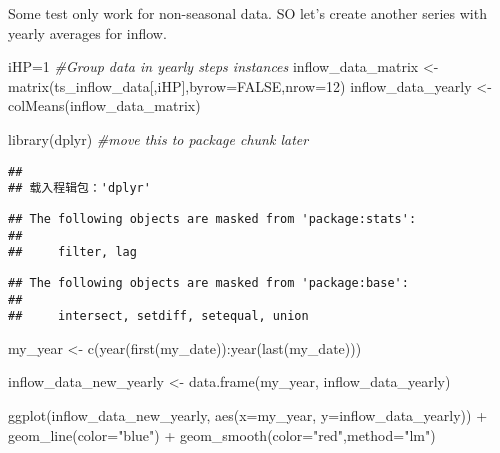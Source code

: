 \documentclass[
]{article}
\newenvironment{Shaded}{\begin{snugshade}}{\end{snugshade}}
\newcommand{\AttributeTok}[1]{\textcolor[rgb]{0.77,0.63,0.00}{#1}}
\newcommand{\CommentTok}[1]{\textcolor[rgb]{0.56,0.35,0.01}{\textit{#1}}}
\newcommand{\ConstantTok}[1]{\textcolor[rgb]{0.00,0.00,0.00}{#1}}
\newcommand{\DecValTok}[1]{\textcolor[rgb]{0.00,0.00,0.81}{#1}}
\newcommand{\FunctionTok}[1]{\textcolor[rgb]{0.00,0.00,0.00}{#1}}
\newcommand{\NormalTok}[1]{#1}
\newcommand{\OtherTok}[1]{\textcolor[rgb]{0.56,0.35,0.01}{#1}}
\newcommand{\SpecialCharTok}[1]{\textcolor[rgb]{0.00,0.00,0.00}{#1}}
\newcommand{\StringTok}[1]{\textcolor[rgb]{0.31,0.60,0.02}{#1}}
\begin{document}
Some test only work for non-seasonal data. SO let's create another
series with yearly averages for inflow.

\begin{Shaded}
\begin{Highlighting}[]
\NormalTok{iHP}\OtherTok{=}\DecValTok{1}
\CommentTok{\#Group data in yearly steps instances}
\NormalTok{inflow\_data\_matrix }\OtherTok{\textless{}{-}} \FunctionTok{matrix}\NormalTok{(ts\_inflow\_data[,iHP],}\AttributeTok{byrow=}\ConstantTok{FALSE}\NormalTok{,}\AttributeTok{nrow=}\DecValTok{12}\NormalTok{)}
\NormalTok{inflow\_data\_yearly }\OtherTok{\textless{}{-}} \FunctionTok{colMeans}\NormalTok{(inflow\_data\_matrix)}

\FunctionTok{library}\NormalTok{(dplyr)  }\CommentTok{\#move this to package chunk later}
\end{Highlighting}
\end{Shaded}

\begin{verbatim}
## 
## 载入程辑包：'dplyr'
\end{verbatim}

\begin{verbatim}
## The following objects are masked from 'package:stats':
## 
##     filter, lag
\end{verbatim}

\begin{verbatim}
## The following objects are masked from 'package:base':
## 
##     intersect, setdiff, setequal, union
\end{verbatim}

\begin{Shaded}
\begin{Highlighting}[]
\NormalTok{my\_year }\OtherTok{\textless{}{-}} \FunctionTok{c}\NormalTok{(}\FunctionTok{year}\NormalTok{(}\FunctionTok{first}\NormalTok{(my\_date))}\SpecialCharTok{:}\FunctionTok{year}\NormalTok{(}\FunctionTok{last}\NormalTok{(my\_date)))}

\NormalTok{inflow\_data\_new\_yearly }\OtherTok{\textless{}{-}} \FunctionTok{data.frame}\NormalTok{(my\_year, inflow\_data\_yearly)}

\FunctionTok{ggplot}\NormalTok{(inflow\_data\_new\_yearly, }\FunctionTok{aes}\NormalTok{(}\AttributeTok{x=}\NormalTok{my\_year, }\AttributeTok{y=}\NormalTok{inflow\_data\_yearly)) }\SpecialCharTok{+}
            \FunctionTok{geom\_line}\NormalTok{(}\AttributeTok{color=}\StringTok{"blue"}\NormalTok{) }\SpecialCharTok{+}
            \FunctionTok{geom\_smooth}\NormalTok{(}\AttributeTok{color=}\StringTok{"red"}\NormalTok{,}\AttributeTok{method=}\StringTok{"lm"}\NormalTok{) }
\end{Highlighting}
\end{Shaded}
\end{document}
